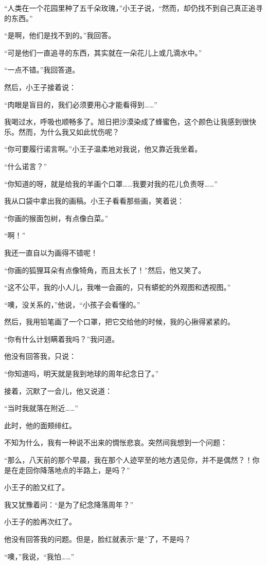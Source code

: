 “人类在一个花园里种了五千朵玫瑰，”小王子说，“然而，却仍找不到自己真正追寻的东西。”

“是啊，他们是找不到的。”我回答。

“可是他们一直追寻的东西，其实就在一朵花儿上或几滴水中。”

“一点不错。”我回答道。

然后，小王子接着说：

“肉眼是盲目的，我们必须要用心才能看得到\ldots{}\ldots{}”

我喝过水，呼吸也顺畅多了。旭日把沙漠染成了蜂蜜色，这个颜色让我感到很快乐。然而，为什么我又如此忧伤呢？

“你可要履行诺言啊。”小王子温柔地对我说，他又靠近我坐着。

“什么诺言？”

“你知道的呀，就是给我的羊画个口罩\ldots{}\ldots{}我要对我的花儿负责呀\ldots{}\ldots{}”

我从口袋中拿出我的画稿。小王子看看那些画，笑着说：

“你画的猴面包树，有点像白菜。”

“啊！”

我还一直自以为画得不错呢！

“你画的狐狸耳朵有点像犄角，而且太长了！”然后，他又笑了。

“这不公平，我的小人儿，我唯一会画的，只有蟒蛇的外观图和透视图。”

“噢，没关系的，”他说，“小孩子会看懂的。”

然后，我用铅笔画了一个口罩，把它交给他的时候，我的心揪得紧紧的。

“你有什么计划瞒着我吗？”我问道。

他没有回答我，只说：

“你知道吗，明天就是我到地球的周年纪念日了。”

接着，沉默了一会儿，他又说道：

“当时我就落在附近\ldots{}\ldots{}”

此时，他的面颊绯红。

不知为什么，我有一种说不出来的惆怅悲哀。突然间我想到一个问题：

“那么，八天前的那个早晨，我在那个人迹罕至的地方遇见你，并不是偶然？！你是在走回你降落地点的半路上，是吗？”

小王子的脸又红了。

我又犹豫着问：“是为了纪念降落周年？”

小王子的脸再次红了。

他没有回答我的问题。但是，脸红就表示“是”了，不是吗？

“噢，”我说，“我怕\ldots{}\ldots{}”

